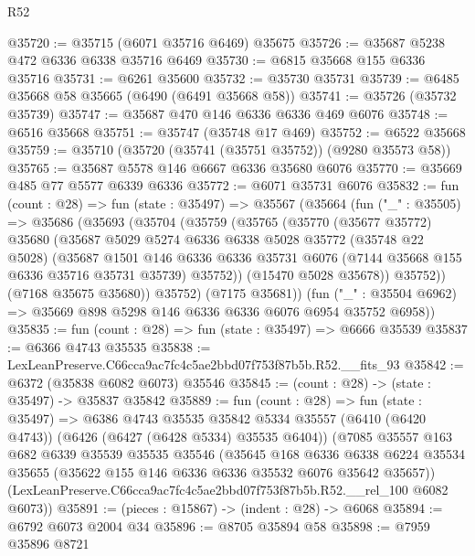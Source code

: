 \begin{lexlean}{R52}
\begin{coremodule}
@35720 := @35715 (@6071 @35716 @6469) @35675
@35726 := @35687 @5238 @472 @6336 @6338 @35716 @6469
@35730 := @6815 @35668 @155 @6336 @35716
@35731 := @6261 @35600
@35732 := @35730 @35731
@35739 := @6485 @35668 @58 @35665 (@6490 (@6491 @35668 @58))
@35741 := @35726 (@35732 @35739)
@35747 := @35687 @470 @146 @6336 @6336 @469 @6076
@35748 := @6516 @35668
@35751 := @35747 (@35748 @17 @469)
@35752 := @6522 @35668
@35759 := @35710 (@35720 (@35741 (@35751 @35752)) (@9280 @35573 @58))
@35765 := @35687 @5578 @146 @6667 @6336 @35680 @6076
@35770 := @35669 @485 @77 @5577 @6339 @6336
@35772 := @6071 @35731 @6076
@35832 := fun (count : @28) =>
  fun (state : @35497) =>
  @35567
    (@35664
      (fun ("_" : @35505) =>
      @35686
        (@35693
          (@35704
            (@35759
              (@35765
                (@35770
                  (@35677 @35772)
                  @35680
                  (@35687
                    @5029
                    @5274
                    @6336
                    @6338
                    @5028
                    @35772
                    (@35748 @22 @5028)
                    (@35687
                      @1501
                      @146
                      @6336
                      @6336
                      @35731
                      @6076
                      (@7144 @35668 @155 @6336 @35716 @35731 @35739)
                      @35752))
                  (@15470 @5028 @35678))
                @35752))
            (@7168 @35675 @35680))
          @35752)
        (@7175 @35681))
      (fun ("_" : @35504 @6962) => @35669 @898 @5298 @146 @6336 @6336 @6076 @6954 @35752 @6958))
@35835 := fun (count : @28) => fun (state : @35497) => @6666 @35539
@35837 := @6366 @4743 @35535
@35838 := LexLeanPreserve.C66cca9ac7fc4c5ae2bbd07f753f87b5b.R52.__fits_93
@35842 := @6372 (@35838 @6082 @6073) @35546
@35845 := (count : @28) -> (state : @35497) -> @35837 @35842
@35889 := fun (count : @28) =>
  fun (state : @35497) =>
  @6386
    @4743
    @35535
    @35842
    @5334
    @35557
    (@6410 (@6420 @4743))
    (@6426 (@6427 (@6428 @5334) @35535 @6404))
    (@7085
      @35557
      @163
      @682
      @6339
      @35539
      @35535
      @35546
      (@35645
        @168
        @6336
        @6338
        @6224
        @35534
        @35655
        (@35622 @155 @146 @6336 @6336 @35532 @6076 @35642 @35657))
      (LexLeanPreserve.C66cca9ac7fc4c5ae2bbd07f753f87b5b.R52.__rel_100 @6082 @6073))
@35891 := (pieces : @15867) -> (indent : @28) -> @6068
@35894 := @6792 @6073 @2004 @34
@35896 := @8705 @35894 @58
@35898 := @7959 @35896 @8721

\end{coremodule}
\end{lexlean}
